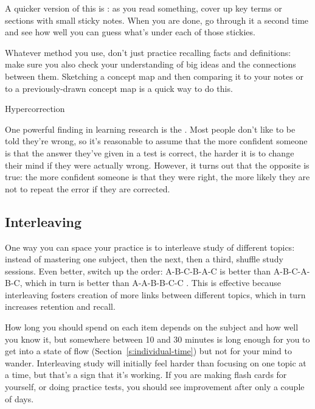 A quicker version of this is
: as you read something,
cover up key terms or sections with small sticky notes. When you are
done, go through it a second time and see how well you can guess
what's under each of those stickies.

Whatever method you use, don't just practice recalling facts and
definitions: make sure you also check your understanding of big ideas
and the connections between them. Sketching a concept map and then
comparing it to your notes or to a previously-drawn concept map is a
quick way to do this.

\begin{aside}{Hypercorrection}

One powerful finding in learning research is the  \cite{Metc2016}. Most people don't
like to be told they're wrong, so it's reasonable to assume that the
more confident someone is that the answer they've given in a test is
correct, the harder it is to change their mind if they were actually
wrong. However, it turns out that the opposite is true: the more
confident someone is that they were right, the more likely they are
not to repeat the error if they are corrected.

\end{aside}

\subsection{Interleaving}\label{interleaving}

One way you can space your practice is to interleave study of different
topics: instead of mastering one subject, then the next, then a third,
shuffle study sessions. Even better, switch up the order: A-B-C-B-A-C is
better than A-B-C-A-B-C, which in turn is better than A-A-B-B-C-C
\cite{Rohrer2015}. This is effective because interleaving fosters
creation of more links between different topics, which in turn increases
retention and recall.

How long you should spend on each item depends on the subject and how
well you know it, but somewhere between 10 and 30 minutes is long enough
for you to get into a state of flow (Section~\ref{s:individual-time}) but
not for your mind to wander. Interleaving study will initially feel
harder than focusing on one topic at a time, but that's a sign that it's
working. If you are making flash cards for yourself, or doing practice
tests, you should see improvement after only a couple of days.

